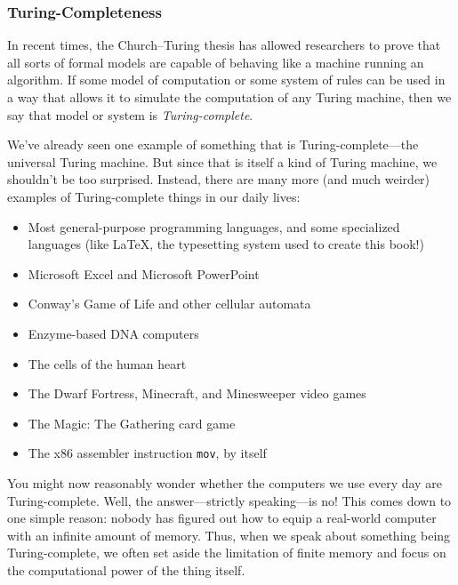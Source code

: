 \subsubsection*{Turing-Completeness}

In recent times, the Church--Turing thesis has allowed researchers to prove that all sorts of formal models are capable of behaving like a machine running an algorithm. If some model of computation or some system of rules can be used in a way that allows it to simulate the computation of any Turing machine, then we say that model or system is \emph{Turing-complete}.

We've already seen one example of something that is Turing-complete---the universal Turing machine. But since that is itself a kind of Turing machine, we shouldn't be too surprised. Instead, there are many more (and much weirder) examples of Turing-complete things in our daily lives:
\begin{colouredbox}
\begin{itemize}
\item Most general-purpose programming languages, and some specialized languages (like \LaTeX, the typesetting system used to create this book!)
\item Microsoft Excel and Microsoft PowerPoint
\item Conway's Game of Life and other cellular automata
\item Enzyme-based DNA computers
\item The cells of the human heart
\item The Dwarf Fortress, Minecraft, and Minesweeper video games
\item The Magic: The Gathering card game
\item The x86 assembler instruction \texttt{mov}, by itself
\end{itemize}
\end{colouredbox}
You might now reasonably wonder whether the computers we use every day are Turing-complete. Well, the answer---strictly speaking---is no! This comes down to one simple reason: nobody has figured out how to equip a real-world computer with an infinite amount of memory. Thus, when we speak about something being Turing-complete, we often set aside the limitation of finite memory and focus on the computational power of the thing itself.